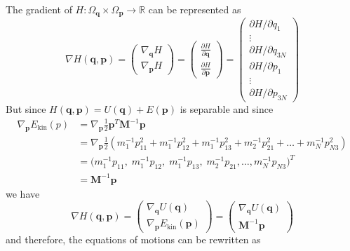 \documentclass{article}
\begin{document}
    The gradient of $H: \Omega_\mathbf{q} \times \Omega_\mathbf{p} \longrightarrow \mathbb{R}$ can be represented as 
    \begin{equation}
      \nabla H(\mathbf{q}, \mathbf{p}) = 
      \begin{pmatrix} \nabla_\mathbf{q} H \\[1mm] \nabla_\mathbf{p} H \end{pmatrix} =
      \begin{pmatrix} \frac{\partial H}{\partial \mathbf{q}} \\[2mm] \frac{\partial H}{\partial \mathbf{p}} \end{pmatrix} = 
      \begin{pmatrix} \partial H / \partial q_1 \\ \vdots \\ \partial H / \partial q_{3N} \\ \partial H / \partial p_1 \\ \vdots \\ \partial H / \partial p_{3N} \end{pmatrix}
    \end{equation}
    But since $H(\mathbf{q}, \mathbf{p}) = U(\mathbf{q}) + E (\mathbf{p})$ is separable and since 
    \begin{align*}
      \nabla_\mathbf{p} E_\mathrm{kin}(p) & = \nabla_\mathbf{p} \frac{1}{2} \mathbf{p}^T \mathbf{M}^{-1} \mathbf{p} \\
      & = \nabla_\mathbf{p} \frac{1}{2} (m_1^{-1} p_{11}^2 + m_1^{-1} p_{12}^2 + m_1^{-1} p_{13}^2 + m_2^{-1} p_{21}^2 + \ldots + m_N^{-1} p_{N3}^2) \\
      & = \big(m_1^{-1} p_{11}, \;m_1^{-1} p_{12}, \;m_1^{-1} p_{13}, \;m_2^{-1} p_{21}, \ldots, m_N^{-1} p_{N3} \big)^T \\
      & = \mathbf{M}^{-1} \mathbf{p} 
    \end{align*}
    we have 
    \begin{equation}
      \nabla H(\mathbf{q}, \mathbf{p}) = \begin{pmatrix} \nabla_\mathbf{q} U (\mathbf{q})\\ \nabla_\mathbf{p} E_\mathrm{kin} (\mathbf{p}) \end{pmatrix} = \begin{pmatrix} \nabla_\mathbf{q} U (\mathbf{q})\\ \mathbf{M}^{-1} \mathbf{p} \end{pmatrix} 
    \end{equation}
    and therefore, the equations of motions can be rewritten as 
\end{document}
